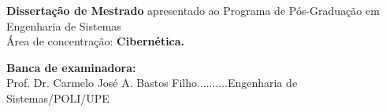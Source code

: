 \begin{center}
\begin{center}
\end{center}


\begin{flushright}
\vspace{0.5in}
\parbox{3.15in}
 {\textbf{Dissertação de Mestrado} apresentado ao Programa de Pós-Graduação em Engenharia de Sistemas\\
 Área de concentração: \textbf{Cibernética.} }
\end{flushright}



\vspace{0.5in}

\begin{flushleft}

\vspace{1ex} \textbf{Banca de examinadora:} \\

\vspace{1ex} Prof. Dr.  Carmelo José A. Bastos Filho..........Engenharia de Sistemas/POLI/UPE \\


\end{flushleft}


\vspace{0.2in}
\dataQualif

\end{center}

